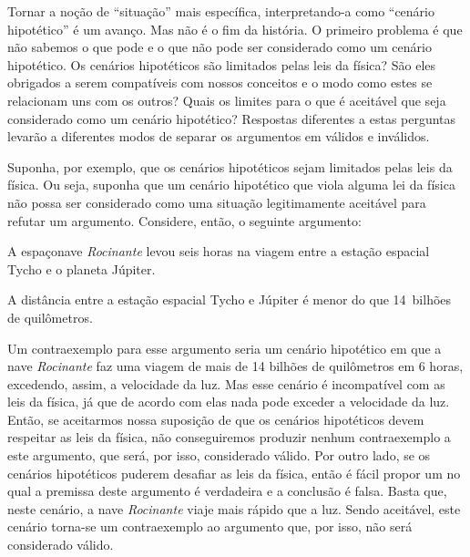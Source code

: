 Tornar a noção de ``situação'' mais específica, interpretando-a como ``cenário hipotético'' é um avanço.
Mas não é o fim da história.
O primeiro problema é que não sabemos o que pode e o que não pode ser considerado como um cenário hipotético.
Os cenários hipotéticos são limitados pelas leis da física?
São eles obrigados a serem compatíveis com nossos conceitos e o modo como estes se relacionam uns com os outros?
Quais os limites para o que é aceitável que seja considerado como um cenário hipotético?
Respostas diferentes a estas perguntas levarão a diferentes modos de separar os argumentos em válidos e inválidos.

Suponha, por exemplo, que os cenários hipotéticos sejam limitados pelas leis da física.
Ou seja, suponha que um cenário hipotético que viola alguma lei da física não possa ser considerado como uma situação legitimamente aceitável para refutar um argumento.
Considere, então, o seguinte argumento:
	\begin{earg}
		\item[] A espaçonave \emph{Rocinante} levou seis horas na viagem entre a estação espacial Tycho e o planeta Júpiter.
		\item[\therefore] A distância entre a estação espacial Tycho e Júpiter é menor do que 14~bilhões de quilômetros.
	\end{earg}
Um contraexemplo para esse argumento seria um cenário hipotético em que a nave \emph{Rocinante} faz uma viagem de mais de 14 bilhões de quilômetros em 6 horas, excedendo, assim, a velocidade da luz.
Mas esse cenário é incompatível com as leis da física, já que de acordo com elas nada pode exceder a velocidade da luz.
Então, se aceitarmos nossa suposição de que os cenários hipotéticos devem respeitar as leis da física, não conseguiremos produzir nenhum contraexemplo a este argumento, que será, por isso, considerado válido.
Por outro lado, se os cenários hipotéticos puderem desafiar as leis da física, então é fácil propor um no qual a premissa deste argumento é verdadeira e a conclusão é falsa.
Basta que, neste cenário, a nave \emph{Rocinante} viaje mais rápido que a luz.
Sendo aceitável, este cenário torna-se um contraexemplo ao argumento que, por isso, não será considerado válido.	


